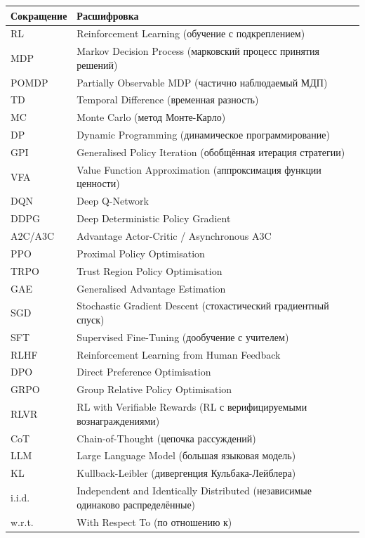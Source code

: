 \begin{center}
\begin{tabular}{@{}ll@{}}
\toprule
\textbf{Сокращение} & \textbf{Расшифровка} \\
\midrule
RL     & Reinforcement Learning (обучение с подкреплением) \\
MDP    & Markov Decision Process (марковский процесс принятия решений) \\
POMDP  & Partially Observable MDP (частично наблюдаемый МДП) \\
TD     & Temporal Difference (временная разность) \\
MC     & Monte Carlo (метод Монте-Карло) \\
DP     & Dynamic Programming (динамическое программирование) \\
GPI    & Generalised Policy Iteration (обобщённая итерация стратегии) \\
VFA    & Value Function Approximation (аппроксимация функции ценности) \\
DQN    & Deep Q-Network \\
DDPG   & Deep Deterministic Policy Gradient \\
A2C/A3C & Advantage Actor-Critic / Asynchronous A3C \\
PPO    & Proximal Policy Optimisation \\
TRPO   & Trust Region Policy Optimisation \\
GAE    & Generalised Advantage Estimation \\
SGD    & Stochastic Gradient Descent (стохастический градиентный спуск) \\
SFT    & Supervised Fine-Tuning (дообучение с учителем) \\
RLHF   & Reinforcement Learning from Human Feedback \\
DPO    & Direct Preference Optimisation \\
GRPO   & Group Relative Policy Optimisation \\
RLVR   & RL with Verifiable Rewards (RL с верифицируемыми вознаграждениями) \\
CoT    & Chain-of-Thought (цепочка рассуждений) \\
LLM    & Large Language Model (большая языковая модель) \\
KL     & Kullback-Leibler (дивергенция Кульбака-Лейблера) \\
i.i.d. & Independent and Identically Distributed (независимые одинаково распределённые) \\
w.r.t. & With Respect To (по отношению к) \\
\bottomrule
\end{tabular}
\end{center}
